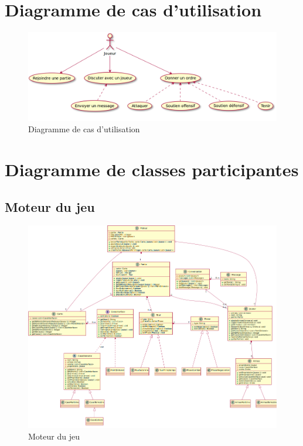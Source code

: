 \section{Diagramme de cas d'utilisation}
	\begin{figure}[!h]
		\centering
		\includegraphics[scale=0.4]{images/UseCase.png}
		\caption{Diagramme de cas d'utilisation}
	\end{figure}
\newpage
\section{Diagramme de classes participantes}
\subsection{Moteur du jeu}
	\begin{figure}[!h]
		\centering
		\includegraphics[scale=0.6,angle=90]{images/DCP1.png}
		\caption{Moteur du jeu}
	\end{figure}
\newpage
